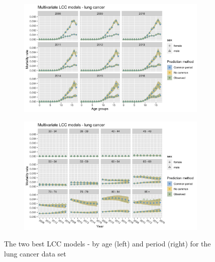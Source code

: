 \begin{figure}[h!]
    \centering
    \begin{subfigure}[b]{.45\linewidth}
        \includegraphics[width=\linewidth]{real-data/real-data-multivariate/Figures/multivariate-LCC-by-age-lung.png}
    \end{subfigure}
    \begin{subfigure}[b]{.45\linewidth}
        \includegraphics[width=\linewidth]{real-data/real-data-multivariate/Figures/multivariate-LCC-by-period-lung.png}
    \end{subfigure}
    \caption{The two best LCC models - by age (left) and period (right) for the lung cancer data set}
    \label{fig:mv-LCC-lung}
\end{figure}

